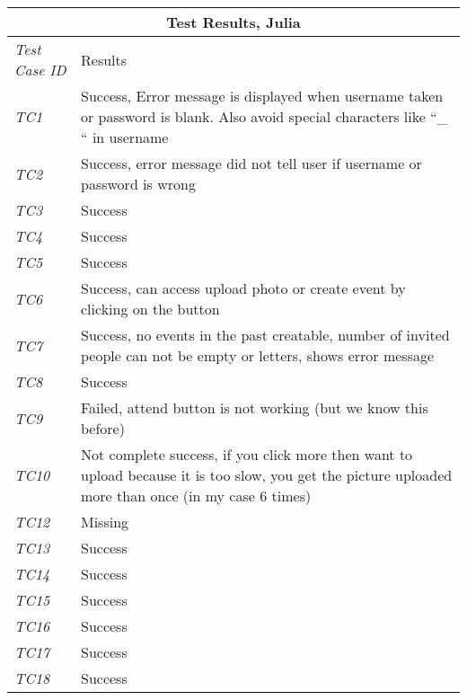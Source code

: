 \begin{minipage}{\linewidth}
\setlength{\tabcolsep}{15pt}
\centering
{}
\begin{tabular}{ |l|p{70mm}| }
	\hline
	\multicolumn{2}{|c|}{\cellcolor{gray!25} \textbf{Test Results, Julia}} \\
	\hline
	\it{\cellcolor{gray!25}Test Case ID} & {\cellcolor{gray!25} Results } \\
	\hline
	\it{\cellcolor{gray!25}TC1} & Success, 
Error message is displayed when username taken or password is blank. Also avoid special characters like ``\_ `` in username \\ \hline
	\it{\cellcolor{gray!25}TC2} & Success, error message did not tell user if username or password is wrong \\ \hline
	\it{\cellcolor{gray!25}TC3} & Success \\ \hline
	\it{\cellcolor{gray!25}TC4} & Success \\ \hline
	\it{\cellcolor{gray!25}TC5} & Success \\ \hline
	\it{\cellcolor{gray!25}TC6} & Success, can access upload photo or create event by clicking on the button \\ \hline
	\it{\cellcolor{gray!25}TC7} & Success, no events in the past creatable, number of invited people can not be empty or letters, shows error message \\ \hline
	\it{\cellcolor{gray!25}TC8} & Success \\ \hline
	\it{\cellcolor{gray!25}TC9} & Failed, attend button is not working (but we know this before) \\ \hline
	\it{\cellcolor{gray!25}TC10} & Not complete success, if you click more then want to upload because it is too slow, you get the picture uploaded more than once (in my case 6 times) \\ \hline
	\it{\cellcolor{gray!25}TC12} & Missing \\ \hline
	\it{\cellcolor{gray!25}TC13} & Success \\ \hline
	\it{\cellcolor{gray!25}TC14} & Success \\ \hline
	\it{\cellcolor{gray!25}TC15} & Success \\ \hline
	\it{\cellcolor{gray!25}TC16} & Success \\ \hline
	\it{\cellcolor{gray!25}TC17} & Success \\ \hline
	\it{\cellcolor{gray!25}TC18} & Success \\ \hline
\end{tabular}
\medskip
\end{minipage}
